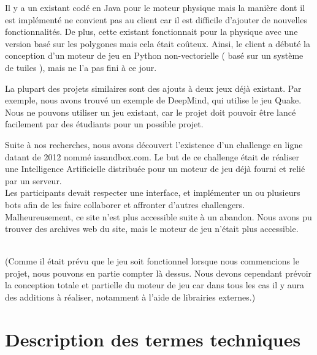 \documentclass[french]{article}
\begin{document}
Il y a un existant codé en Java pour le moteur physique mais la manière dont il est implémenté ne convient pas au client car il est difficile d'ajouter de nouvelles fonctionnalités. De plus, cette existant fonctionnait pour la physique avec une version basé sur les polygones mais cela était coûteux. Ainsi, le client a débuté la conception d'un moteur de jeu en Python non-vectorielle ( basé sur un système de tuiles ), mais ne l'a pas fini à ce jour. \newline

La plupart des projets similaires sont des ajouts à deux jeux déjà existant. Par exemple, nous avons trouvé un exemple de DeepMind\cite{Jaderberg859}, qui utilise le jeu Quake. Nous ne pouvons utiliser un jeu existant, car le projet doit pouvoir être lancé facilement par des étudiants pour un possible projet. \newline

Suite à nos recherches, nous avons découvert l'existence d'un challenge en ligne datant de 2012 nommé iasandbox.com. Le but de ce challenge était de réaliser une Intelligence Artificielle distribuée pour un moteur de jeu déjà fourni et relié par un serveur. \\Les participants devait respecter une interface, et implémenter un ou plusieurs bots afin de les faire collaborer et affronter d'autres challengers. Malheureusement, ce site n'est plus accessible suite à un abandon. Nous avons pu trouver des archives web du site, mais le moteur de jeu n'était plus accessible. 

\\
(Comme il était prévu que le jeu soit fonctionnel lorsque nous commencions le projet, nous pouvons en partie compter là dessus. Nous devons cependant prévoir la conception totale et partielle du moteur de jeu car dans tous les cas il y aura des additions à réaliser, notamment à l'aide de librairies externes.)


\section{Description des termes techniques}
\end{document}
